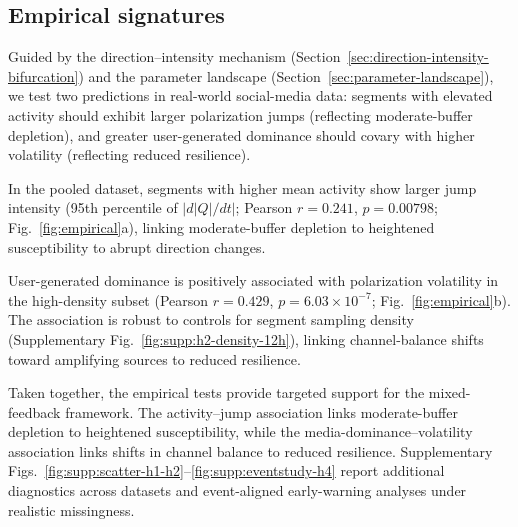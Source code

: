 \documentclass[11pt]{article}
\begin{document}
\subsection{Empirical signatures}
\label{sec:empirical-signatures}
Guided by the direction--intensity mechanism (Section~\ref{sec:direction-intensity-bifurcation}) and the parameter landscape (Section~\ref{sec:parameter-landscape}), we test two predictions in real-world social-media data: segments with elevated activity should exhibit larger polarization jumps (reflecting moderate-buffer depletion), and greater user-generated dominance should covary with higher volatility (reflecting reduced resilience).

In the pooled dataset, segments with higher mean activity show larger jump intensity (95th percentile of $|d|Q|/dt|$; Pearson $r=0.241$, $p=0.00798$; Fig.~\ref{fig:empirical}a), linking moderate-buffer depletion to heightened susceptibility to abrupt direction changes.

User-generated dominance is positively associated with polarization volatility in the high-density subset (Pearson $r=0.429$, $p=6.03\times 10^{-7}$; Fig.~\ref{fig:empirical}b). The association is robust to controls for segment sampling density (Supplementary Fig.~\ref{fig:supp:h2-density-12h}), linking channel-balance shifts toward amplifying sources to reduced resilience.

Taken together, the empirical tests provide targeted support for the mixed-feedback framework. The activity--jump association links moderate-buffer depletion to heightened susceptibility, while the media-dominance--volatility association links shifts in channel balance to reduced resilience. Supplementary Figs.~\ref{fig:supp:scatter-h1-h2}--\ref{fig:supp:eventstudy-h4} report additional diagnostics across datasets and event-aligned early-warning analyses under realistic missingness.
\end{document}
